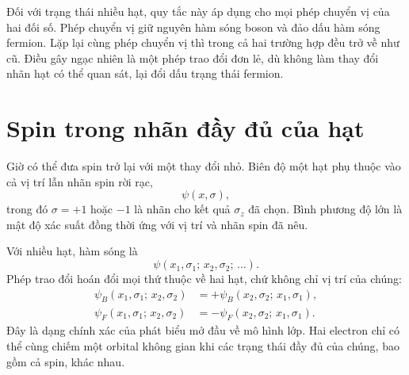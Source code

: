 Đối với trạng thái nhiều hạt, quy tắc này áp dụng cho mọi phép chuyển vị của hai đối số. Phép chuyển vị giữ nguyên hàm sóng boson và đảo dấu hàm sóng fermion. Lặp lại cùng phép chuyển vị thì trong cả hai trường hợp đều trở về như cũ. Điều gây ngạc nhiên là một phép trao đổi đơn lẻ, dù không làm thay đổi nhãn hạt có thể quan sát, lại đổi dấu trạng thái fermion.

\section{Spin trong nhãn đầy đủ của hạt}

Giờ có thể đưa spin trở lại với một thay đổi nhỏ. Biên độ một hạt phụ thuộc vào cả vị trí lẫn nhãn spin rời rạc,
\begin{equation}
\psi(x,\sigma),
\end{equation}
trong đó \(\sigma=+1\) hoặc \(-1\) là nhãn cho kết quả \(\sigma_z\) đã chọn. Bình phương độ lớn là mật độ xác suất đồng thời ứng với vị trí và nhãn spin đã nêu.

Với nhiều hạt, hàm sóng là
\begin{equation}
\psi(x_1,\sigma_1;\,x_2,\sigma_2;\,\ldots).
\end{equation}
Phép trao đổi hoán đổi mọi thứ thuộc về hai hạt, chứ không chỉ vị trí của chúng:
\begin{align}
\psi_B(x_1,\sigma_1;\,x_2,\sigma_2)
&=
+\psi_B(x_2,\sigma_2;\,x_1,\sigma_1),\\
\psi_F(x_1,\sigma_1;\,x_2,\sigma_2)
&=
-\psi_F(x_2,\sigma_2;\,x_1,\sigma_1).
\end{align}
Đây là dạng chính xác của phát biểu mở đầu về mô hình lớp. Hai electron chỉ có thể cùng chiếm một orbital không gian khi các trạng thái đầy đủ của chúng, bao gồm cả spin, khác nhau.

\begin{classroomqa}
\end{classroomqa}

\begin{classroomqa}
\end{classroomqa}

